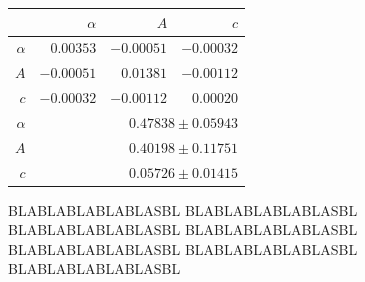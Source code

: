 \begin{figure}
\caption{
BLABLABLABLABLASBL
BLABLABLABLABLASBL
BLABLABLABLABLASBL
BLABLABLABLABLASBL
BLABLABLABLABLASBL
BLABLABLABLABLASBL
BLABLABLABLABLASBL
}

 \begin{tabular}{|r|r|r|r|}
 \hline 
\cellcolor{tabcolor}&\cellcolor{tabcolor}$\alpha$&\cellcolor{tabcolor}$A$&\cellcolor{tabcolor}$c$\\ \hline 
 \cellcolor{tabcolor}$\alpha$&$0.00353$ &$-0.00051$ &$-0.00032$ \\ 
\cellcolor{tabcolor}$A$&$-0.00051$ &$0.01381$ &$-0.00112$ \\ 
\cellcolor{tabcolor}$c$&$-0.00032$ &$-0.00112$ &$0.00020$ \\ \hline \hline
\cellcolor{tabcolor}$\alpha$&\multicolumn{3}{r|}{$0.47838 \pm 0.05943$ }\\ 
\cellcolor{tabcolor}$A$&\multicolumn{3}{r|}{$0.40198 \pm 0.11751$ }\\ 
\cellcolor{tabcolor}$c$&\multicolumn{3}{r|}{$0.05726 \pm 0.01415$ }\\ 
\hline\end{tabular}

\end{figure}

